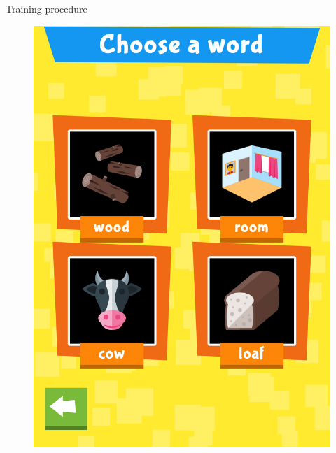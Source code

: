 \documentclass[final,xcolor={cmyk,hyperref}]{beamer}
\begin{document}
\begin{frame}[t]
\begin{columns}[t]
\begin{column}{0.45\linewidth}
\begin{block}{Training procedure}
\begin{figure}[h]
\begin{columns}
\begin{column}{\screenshotwidth}
    \includegraphics[width=\linewidth]{images/CALVin-screenshots/jpgs/choose_word}
  \end{column}
\end{columns}
\vspace*{1ex}
\begin{columns}
  \begin{column}{\screenshotwidth}

\end{column}
\end{columns}
\end{figure}
\end{block}
\end{column}
\end{columns}
\end{frame}
\end{document}
